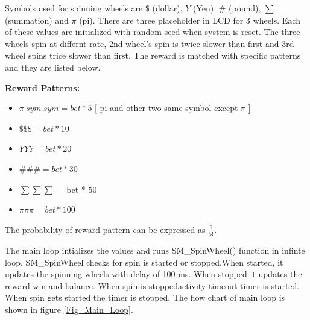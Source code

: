 \documentclass[a4paper,13pt,openany,sffamily]{memoir}
\begin{document}
\newpage
Symbols used for spinning wheels are \(\$\) (dollar), \(Y\) (Yen), \(\#\) (pound), \(\sum\) (summation) and \(\pi\) (pi). There are three placeholder in LCD for 3 wheels. Each of these values are initialized with random seed when system is reset. The three wheels spin at differnt rate, 2nd wheel's spin is twice slower than first and 3rd wheel spins trice slower than first. The reward is matched with specific patterns and they are listed below. 

\large \textbf {Reward Patterns:}

\begin{itemize}
\item \normalsize \( \pi\ sym\ sym = bet * 5 \)  [ pi and other two same symbol except \(\pi\) ] 
\item \( \$ \$ \$ = bet * 10 \)  
\item \( Y Y Y = bet * 20  \)
\item \( \# \# \# = bet * 30 \) 
\item \tiny \( \sum \sum \sum\) \normalsize = bet * 50
\item \normalsize \( \pi \pi \pi = bet * 100 \)   
\end{itemize}
 
The probability of reward pattern can be expressed as \bfseries \( \frac{9}{5!} \).

\newpage
The main loop intializes the values and runs SM\_SpinWheel() function in infinte loop. SM\_SpinWheel checks for spin is started or stopped.When started, it updates the spinning wheels with delay of 100 ms. When stopped it updates the reward win and balance. When spin is stoppedactivity timeout timer is started. When spin gets started the timer is stopped. The flow chart of main loop is shown in figure \ref{Fig_Main_Loop}. 
\newlength{\textundbildtextheight}
 
\end{document}
